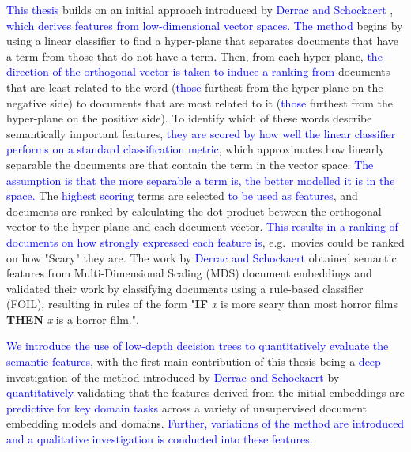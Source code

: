 \documentclass[a4paper,oneside,onecolumn,openright,12pt]{book}
\newcommand\hmark[1]{\textcolor{blue}{#1}}
\begin{document}
\hmark{This thesis} builds on an initial approach introduced by  \hmark{Derrac and Schockaert} \cite{Derrac2015}, \hmark{which derives features from low-dimensional vector spaces. The method} begins by using a linear classifier to find a hyper-plane that separates documents that have a term from those that  do not have a term. Then, from each hyper-plane, \hmark{the direction of the orthogonal vector is taken to induce a ranking from} documents that are least related to the word (\hmark{those} furthest from the hyper-plane on the negative side) to documents that are most related to it (\hmark{those} furthest from the hyper-plane on the positive side). To identify which of these words describe semantically important features, \hmark{they are scored by how well the linear classifier performs on a standard classification metric},  which approximates how linearly separable the documents are that contain the term in the vector space. \hmark{The assumption is that the more separable a term is, the better modelled it is in the space.} The \hmark{ highest scoring} terms are selected \hmark{to be used as features}, and documents are ranked  by calculating the dot product between the orthogonal vector to the hyper-plane and each document vector. \hmark{This results in  a ranking of   documents on how strongly expressed each   feature is},  e.g.\ movies could be ranked on how "Scary" they are. The work by \hmark{Derrac and Schockaert} \cite{Derrac2015} obtained semantic features from Multi-Dimensional Scaling (MDS) document embeddings and validated their work by classifying documents using a rule-based classifier (FOIL), resulting in rules of the form "\textbf{IF} \textit{x} is more scary than most horror films \textbf{THEN} \textit{x} is a horror film.".  %





\hmark{We introduce the use of low-depth decision trees to quantitatively evaluate the semantic features}, with the first main contribution of this thesis being a \hmark{deep} investigation of the method introduced by \hmark{Derrac and Schockaert} by \hmark{quantitatively} validating that the  features derived from the initial embeddings are \hmark{predictive for key domain tasks} across a variety of unsupervised document embedding models and domains.  \hmark{Further, variations of the method are introduced and a qualitative investigation is conducted into these features.} 
\end{document}
